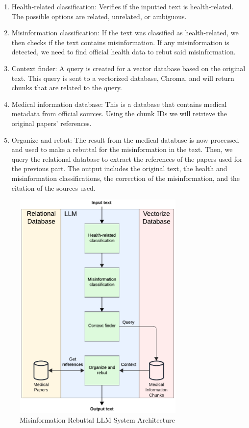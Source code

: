 \begin{enumerate}
	\item Health-related classification: Verifies if the inputted text is health-related. The possible options are related, unrelated, or ambiguous.
	\item Misinformation classification: If the text was classified as health-related, we then checks if the text contains misinformation. If any misinformation is detected, we need to find official health data to rebut said misinformation.
	\item	Context finder: A query is created for a vector database based on the original text. This query is sent to a vectorized database, Chroma, and will return chunks that are related to the query.
	\item	Medical information database:  This is a database that contains medical metadata from official sources. Using the chunk IDs we will retrieve the original papers' references.
	\item	Organize and rebut: The result from the medical database is now processed and used to make a rebuttal for the misinformation in the text. Then, we query the relational database to extract the references of the papers used for the previous part.
	The output includes the original text, the health and misinformation classifications, the correction of the misinformation, and the citation of the sources used. 
\end{enumerate}

\begin{figure}[H]
	\begin{center}
		\includegraphics[width=0.75\textwidth]{images/LLM_Pipeline} %
	\end{center}
	\caption{Misinformation Rebuttal LLM System Architecture} %
	\label{fig:llm}
\end{figure}

